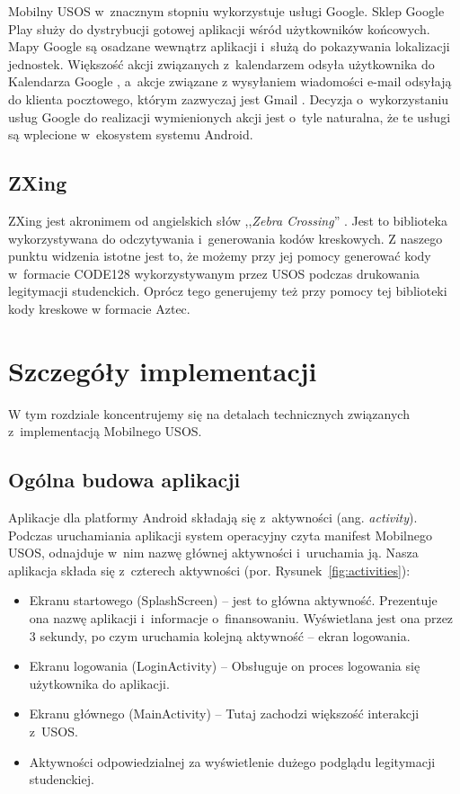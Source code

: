 \documentclass{pracamgr}
\begin{document}
Mobilny USOS w~znacznym stopniu wykorzystuje usługi Google. Sklep Google Play
\cite{googleplay} służy do dystrybucji gotowej aplikacji wśród użytkowników
końcowych. Mapy Google \cite{googlemaps} są osadzane wewnątrz aplikacji i~służą
do pokazywania lokalizacji jednostek. Większość akcji związanych z~kalendarzem
odsyła użytkownika do Kalendarza Google \cite{googlecalendar}, a~akcje związane
z wysyłaniem wiadomości e-mail odsyłają do klienta pocztowego, którym zazwyczaj
jest Gmail \cite{gmail}. Decyzja o~wykorzystaniu usług Google do realizacji
wymienionych akcji jest o~tyle naturalna, że te usługi są wplecione w~ekosystem
systemu Android.

\section{ZXing}

ZXing jest akronimem od angielskich słów ,,\textit{Zebra Crossing}'' \cite{zxing}.
Jest to biblioteka wykorzystywana do odczytywania i~generowania kodów kreskowych.
Z naszego punktu widzenia istotne jest to, że możemy przy jej pomocy generować
kody w~formacie CODE128 wykorzystywanym przez USOS podczas drukowania legitymacji
studenckich. Oprócz tego generujemy też przy pomocy tej biblioteki kody kreskowe
w formacie Aztec.

\chapter{Szczegóły implementacji}

W tym rozdziale koncentrujemy się na detalach technicznych związanych z~implementacją
Mobilnego USOS.

\section{Ogólna budowa aplikacji}

Aplikacje dla platformy Android składają się z~aktywności (ang. \textit{activity}).
Podczas uruchamiania aplikacji system operacyjny czyta manifest Mobilnego USOS,
odnajduje w~nim nazwę głównej aktywności i~uruchamia ją. Nasza aplikacja składa
się z~czterech aktywności (por. Rysunek~\ref{fig:activities}):

\begin{itemize}
	\item Ekranu startowego (SplashScreen) -- jest to główna aktywność.
	      Prezentuje ona nazwę aplikacji i~informacje o~finansowaniu. Wyświetlana
	      jest ona przez 3 sekundy, po czym uruchamia kolejną aktywność -- ekran
	      logowania.
	\item Ekranu logowania (LoginActivity) -- Obsługuje on proces logowania się
	      użytkownika do aplikacji.
	\item Ekranu głównego (MainActivity) -- Tutaj zachodzi większość interakcji
	      z~USOS.
	\item Aktywności odpowiedzialnej za wyświetlenie dużego podglądu legitymacji
	      studenckiej.
\end{itemize}
\end{document}
